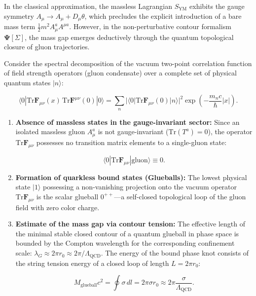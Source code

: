 In the classical approximation, the massless Lagrangian $S_{\text{YM}}$ exhibits the gauge symmetry $A_\mu \to A_\mu + D_\mu \theta$, which precludes the explicit introduction of a bare mass term $\frac{1}{2} m^2 A_\mu^a A^{\mu a}$. However, in the non-perturbative contour formalism $\mathbf{\Psi}[\Sigma]$, the mass gap emerges deductively through the quantum topological closure of gluon trajectories.

Consider the spectral decomposition of the vacuum two-point correlation function of field strength operators (gluon condensate) over a complete set of physical quantum states $|n\rangle$:

\begin{equation}\label{eq:2.3.35}\tag{2.3.35}
\langle 0 | \text{Tr}\mathbf{F}_{\mu\nu}(x) \, \text{Tr}\mathbf{F}^{\mu\nu}(0) | 0 \rangle = \sum_{n} |\langle 0 | \text{Tr}\mathbf{F}_{\mu\nu}(0) | n \rangle|^2 \exp\left( - \frac{m_n c}{\hbar} |x| \right).
\end{equation}

\begin{enumerate}
\item \textbf{Absence of massless states in the gauge-invariant sector:}  
Since an isolated massless gluon $A_\mu^a$ is not gauge-invariant ($\text{Tr}(T^a) = 0$), the operator $\text{Tr}\mathbf{F}_{\mu\nu}$ possesses no transition matrix elements to a single-gluon state:

\begin{equation}\label{eq:2.3.36}\tag{2.3.36}
\langle 0 | \text{Tr}\mathbf{F}_{\mu\nu} | \text{gluon} \rangle \equiv 0.
\end{equation}

\item \textbf{Formation of quarkless bound states (Glueballs):}  
The lowest physical state $|1\rangle$ possessing a non-vanishing projection onto the vacuum operator $\text{Tr}\mathbf{F}_{\mu\nu}$ is the scalar glueball $0^{++}$---a self-closed topological loop of the gluon field with zero color charge.

\item \textbf{Estimate of the mass gap via contour tension:}  
The effective length of the minimal stable closed contour of a quantum glueball in phase space is bounded by the Compton wavelength for the corresponding confinement scale: $\lambda_G \approx 2\pi r_0 \approx 2\pi / \Lambda_{\text{QCD}}$.  
The energy of the bound phase knot consists of the string tension energy of a closed loop of length $L = 2\pi r_0$:

\begin{equation}\label{eq:2.3.37}\tag{2.3.37}
M_{\text{glueball}} c^2 = \oint \sigma \, dl = 2\pi \sigma r_0 \approx 2\pi \frac{\sigma}{\Lambda_{\text{QCD}}}.
\end{equation}
\end{enumerate}

